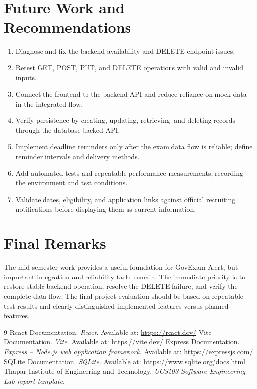 \documentclass[12pt,a4paper]{report}
\begin{document}
\section{Future Work and Recommendations}
\begin{enumerate}[label=\arabic*.]
  \item Diagnose and fix the backend availability and DELETE endpoint issues.
  \item Retest GET, POST, PUT, and DELETE operations with valid and invalid inputs.
  \item Connect the frontend to the backend API and reduce reliance on mock data in the integrated flow.
  \item Verify persistence by creating, updating, retrieving, and deleting records through the database-backed API.
  \item Implement deadline reminders only after the exam data flow is reliable; define reminder intervals and delivery methods.
  \item Add automated tests and repeatable performance measurements, recording the environment and test conditions.
  \item Validate dates, eligibility, and application links against official recruiting notifications before displaying them as current information.
\end{enumerate}

\section{Final Remarks}
The mid-semester work provides a useful foundation for GovExam Alert, but important integration and reliability tasks remain. The immediate priority is to restore stable backend operation, resolve the DELETE failure, and verify the complete data flow. The final project evaluation should be based on repeatable test results and clearly distinguished implemented features versus planned features.

\begin{thebibliography}{9}
 React Documentation. \emph{React}. Available at: \url{https://react.dev/}
 Vite Documentation. \emph{Vite}. Available at: \url{https://vite.dev/}
 Express Documentation. \emph{Express -- Node.js web application framework}. Available at: \url{https://expressjs.com/}
 SQLite Documentation. \emph{SQLite}. Available at: \url{https://www.sqlite.org/docs.html}
 Thapar Institute of Engineering and Technology. \emph{UCS503 Software Engineering Lab report template}.
\end{thebibliography}
\end{document}
